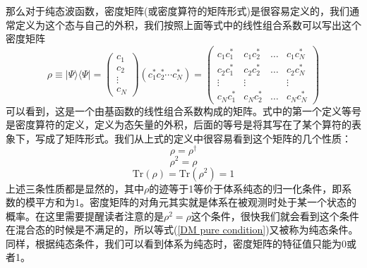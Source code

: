 \documentclass[12pt,a4paper,openany,twoside]{book}
\numberwithin{equation}{section}
\begin{document}
  那么对于纯态波函数，密度矩阵(或密度算符的矩阵形式)是很容易定义的，我们通常定义为这个态与自己的外积，我们按照上面等式中的线性组合系数可以写出这个密度矩阵
  \begin{equation}
    \rho \equiv | \Psi \rangle \langle \Psi |=\left( \begin{array}{c}{c_{1}} \\ {c_{2}} \\ {\vdots} \\ {c_{N}}\end{array}\right)\left(c_{1}^{*} c_{2}^{*} \cdots c_{{N}}^{*}\right) =\left( \begin{array}{llll}{c_1 c_1^*} & {c_1 c_2^*}&{\dots}&{c_1c_N^*} \\ {c_2 c_1^*} & {c_2c_2^*}&{\dots}&{c_2c_N^*}\\{\vdots}&{\vdots}&{}&{\vdots}\\{c_Nc_1^*}&{c_Nc_2^*}&{\dots}&{c_Nc_N^*}\end{array}\right)
    \label{DM for pure state}
  \end{equation}
  可以看到，这是一个由基函数的线性组合系数构成的矩阵。式中的第一个定义等号是密度算符的定义，定义为态矢量的外积，后面的等号是将其写在了某个算符的表象下，写成了矩阵形式。我们从上式的定义中很容易看到这个矩阵的几个性质：
  \begin{equation}
    \rho = \rho ^{\dagger}
    \label{DM Hermite}
  \end{equation}
  \begin{equation}
    \rho^2 = \rho 
    \label{DM pure condition}
  \end{equation}
  \begin{equation}
    \text{Tr}(\rho) = \text{Tr}(\rho^2) =1 
    \label{DM properties for pure states}
  \end{equation}
  上述三条性质都是显然的，其中$\rho$的迹等于1等价于体系纯态的归一化条件，即系数的模平方和为1。密度矩阵的对角元其实就是体系在被观测时处于某一个状态的概率。在这里需要提醒读者注意的是$\rho^2 = \rho$这个条件，很快我们就会看到这个条件在混合态的时候是不满足的，所以等式(\ref{DM pure condition})又被称为纯态条件。同样，根据纯态条件，我们可以看到体系为纯态时，密度矩阵的特征值只能为0或者1。
\end{document}
